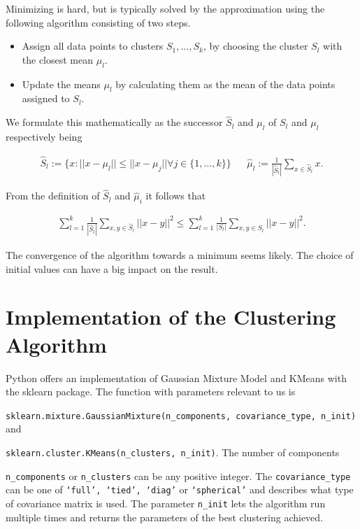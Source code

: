Minimizing is hard, but is typically solved by the approximation using the following algorithm consisting of two steps.

\begin{itemize}
	\item Assign all data points to clusters $S_1, ..., S_k$, by choosing the cluster $S_l$ with the closest mean $\mu_l$.
	\item Update the means $\mu_l$ by calculating them as the mean of the data points assigned to $S_l$.
\end{itemize}

We formulate this mathematically as the successor $\hat{S}_l$ and $\mu_l$ of $S_l$ and $\mu_l$ respectively being

\begin{align*}
	\hat{S}_l := \{x: ||x-\mu_l|| \leq ||x-\mu_j|| \forall j \in \{1, ..., k\} \} &&
	\hat{\mu}_l := \frac{1}{|\hat{S}_l|} \sum_{x \in \hat{S}_l} x.
\end{align*}

From the definition of $\hat{S}_l$ and $\hat{\mu}_i$ it follows that

\begin{align*}
	\sum_{l=1}^{k} \frac{1}{|\hat{S}_l|} \sum_{x, y \in \hat{S}_l} ||x-y||^2 \leq \sum_{l=1}^{k} \frac{1}{|S_l|} \sum_{x, y \in S_l} ||x-y||^2.
\end{align*}

The convergence of the algorithm towards a minimum seems likely. The choice of initial values can have a big impact on the result.

\section{Implementation of the Clustering Algorithm}

Python offers an implementation of Gaussian Mixture Model and KMeans with the sklearn package. The function with parameters relevant to us is

\noindent
\texttt{sklearn.mixture.GaussianMixture(n\_components, covariance\_type, n\_init)} and

\noindent
\texttt{sklearn.cluster.KMeans(n\_clusters, n\_init)}. The number of components

\noindent
\texttt{n\_components} or \texttt{n\_clusters} can be any positive integer. The \texttt{covariance\_type} can be one of \texttt{‘full’, ‘tied’, ‘diag’} or \texttt{‘spherical’} and describes what type of covariance matrix is used. The parameter \texttt{n\_init} lets the algorithm run multiple times and returns the parameters of the best clustering achieved.

